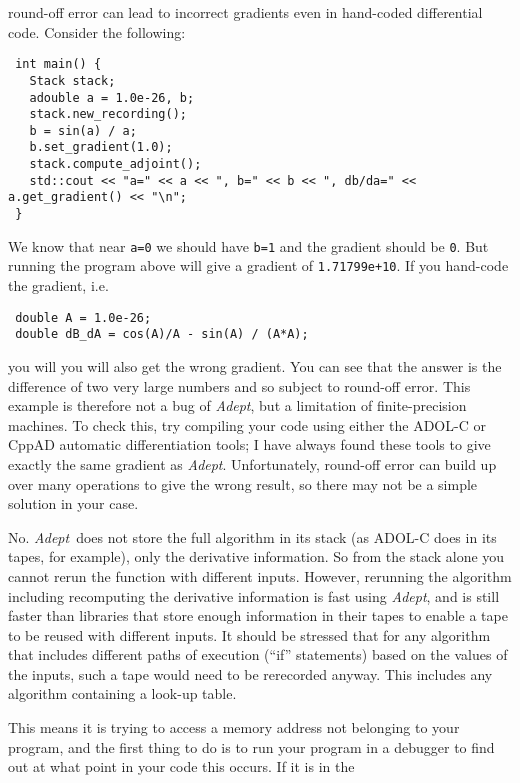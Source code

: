 \documentclass[a4,oneside]{book}
\def\codesize{\small}
\def\Adept{\emph{Adept}}
\def\code#1{{\codesize\texttt{#1}}}
\begin{document}
\begin{description}
  round-off error can lead to incorrect gradients even in hand-coded
  differential code. Consider the following:
\begin{lstlisting}
 int main() {
   Stack stack;
   adouble a = 1.0e-26, b;
   stack.new_recording();
   b = sin(a) / a;
   b.set_gradient(1.0);
   stack.compute_adjoint();
   std::cout << "a=" << a << ", b=" << b << ", db/da=" << a.get_gradient() << "\n";
 }
\end{lstlisting}
  We know that near \code{a=0} we should have \code{b=1} and the
  gradient should be \code{0}.  But running the program above will
  give a gradient of \code{1.71799e+10}. If you hand-code the
  gradient, i.e.
\begin{lstlisting}
 double A = 1.0e-26;
 double dB_dA = cos(A)/A - sin(A) / (A*A);
\end{lstlisting}
  you will you will also get the wrong gradient.  You can see that the
  answer is the difference of two very large numbers and so subject to
  round-off error.  This example is therefore not a bug of \Adept, but
  a limitation of finite-precision machines.  To check this, try
  compiling your code using either the ADOL-C or CppAD automatic
  differentiation tools; I have always found these tools to give
  exactly the same gradient as \Adept. Unfortunately, round-off error
  can build up over many operations to give the wrong result, so there
  may not be a simple solution in your case.
\item[Can \Adept\ reuse a stored tape for multiple runs of the same
  algorithm but with different inputs?] No. \Adept\ does not store the
  full algorithm in its stack (as ADOL-C does in its tapes, for
  example), only the derivative information.  So from the stack alone
  you cannot rerun the function with different inputs.  However,
  rerunning the algorithm including recomputing the derivative
  information is fast using \Adept, and is still faster than libraries
  that store enough information in their tapes to enable a tape to be
  reused with different inputs.  It should be stressed that for any
  algorithm that includes different paths of execution (``if''
  statements) based on the values of the inputs, such a tape would
  need to be rerecorded anyway. This includes any algorithm containing
  a look-up table.
\item[Why does my code crash with a segmentation fault?] This means it
  is trying to access a memory address not belonging to your program,
  and the first thing to do is to run your program in a debugger to
  find out at what point in your code this occurs. If it is in the

\end{description}
\end{document}
